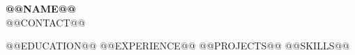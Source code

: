 \documentclass[a4paper,11pt]{article}
\begin{document}
\begin{center}
  \textbf{\Huge\scshape @@NAME@@} \\ \vspace{2pt}
  \small @@CONTACT@@
\end{center}
@@EDUCATION@@
@@EXPERIENCE@@
@@PROJECTS@@
@@SKILLS@@
\end{document}
